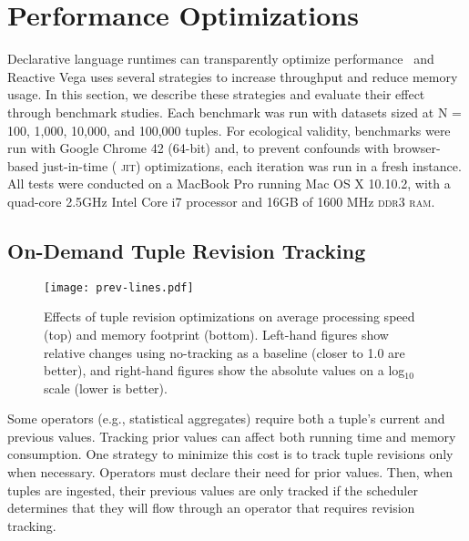 \vspace{-40pt}

\section{Performance Optimizations}
\label{sec:vg:optimizations}

\vspace{-7pt}

Declarative language runtimes can transparently optimize
performance~\cite{heer:protovisjava} and Reactive Vega uses several strategies
to increase throughput and reduce memory usage. In this section, we describe
these strategies and evaluate their effect through benchmark studies. Each
benchmark was run with datasets sized at N = 100, 1,000, 10,000, and 100,000
tuples. For ecological validity, benchmarks were run with Google Chrome 42
(64-bit) and, to prevent confounds with browser-based just-in-time (
\textsc{jit}) optimizations, each iteration was run in a fresh instance. All
tests were conducted on a MacBook Pro running Mac OS X 10.10.2, with a quad-core
2.5GHz Intel Core i7 processor and 16GB of 1600 MHz \textsc{ddr3 ram}.

\vspace{-20pt}

\subsection{On-Demand Tuple Revision Tracking}

\vspace{-7pt}

\begin{figure}[h!]
  \centering
  \texttt{[image: prev-lines.pdf]}
  \caption{Effects of tuple revision optimizations on average
processing speed (top) and memory footprint (bottom). Left-hand figures show
relative changes using no-tracking as a baseline (closer to 1.0 are better),
and right-hand figures show the absolute values on a log$_{10}$ scale
(lower is better).}
  \label{fig:vg:prev_benchmark}
\end{figure}

Some operators (e.g., statistical aggregates) require both a tuple's current and
previous values. Tracking prior values can affect both running time and memory
consumption. One strategy to minimize this cost is to track tuple revisions only
when necessary. Operators must declare their need for prior values. Then, when
tuples are ingested, their previous values are only tracked if the scheduler
determines that they will flow through an operator that requires revision
tracking.

